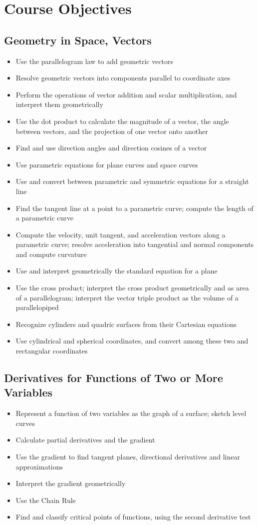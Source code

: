 \documentclass[11pt]{article}
\begin{document}
\section{Course Objectives}
\subsection{Geometry in Space, Vectors}
\begin{itemize}
\setlength\itemsep{-.5em}
\item Use the parallelogram law to add geometric vectors
\item Resolve geometric vectors into components parallel to coordinate axes
\item Perform the operations of vector addition and scalar multiplication,
and interpret them geometrically
\item Use the dot product to calculate the magnitude of a vector,
the angle between vectors, 
and the projection of one vector onto another
\item Find and use direction angles and direction cosines of a vector
\item Use parametric equations for plane curves and space curves
\item Use and convert between parametric and symmetric equations for a straight line
\item Find the tangent line at a point to a parametric curve;
compute the length of a parametric curve
\item Compute the velocity, unit tangent, and acceleration vectors
along a parametric curve; 
resolve acceleration into tangential and normal components and compute curvature
\item Use and interpret geometrically the standard equation for a plane
\item Use the cross product; interpret the cross product geometrically and as area of a parallelogram; 
interpret the vector triple product as the volume of a parallelopiped
\item Recognize cylinders and quadric surfaces from their Cartesian equations
\item Use cylindrical and spherical coordinates,
and convert among these two and rectangular coordinates
\end{itemize}
\subsection{Derivatives for Functions of Two or More Variables}
\begin{itemize}
\setlength\itemsep{-.5em}
\item Represent a function of two variables as the graph of a surface;
sketch level curves
\item Calculate partial derivatives and the gradient
\item Use the gradient to find tangent planes,
directional derivatives and linear approximations
\item Interpret the gradient geometrically
\item Use the Chain Rule
\item Find and classify critical points of functions, using the second derivative test
\end{itemize}
\end{document}
